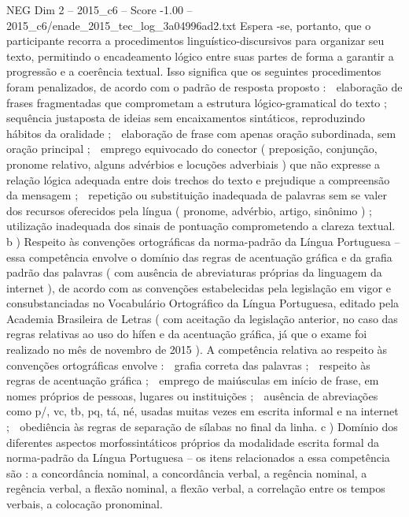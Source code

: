 \begin{textsample}{NEG Dim 2 – 2015\_c6 – Score -1.00 – 2015\_c6/enade\_2015\_tec\_log\_3a04996ad2.txt}
Espera -se, portanto, que o participante recorra a procedimentos linguístico-discursivos para organizar seu texto, permitindo o encadeamento lógico entre suas partes de forma a garantir a progressão e a coerência textual.
Isso significa que os seguintes procedimentos foram penalizados, de acordo com o padrão de resposta proposto :  elaboração de frases fragmentadas que comprometam a estrutura lógico-gramatical do texto ;  sequência justaposta de ideias sem encaixamentos sintáticos, reproduzindo hábitos da oralidade ;  elaboração de frase com apenas oração subordinada, sem oração principal ;  emprego equivocado do conector ( preposição, conjunção, pronome relativo, alguns advérbios e locuções adverbiais ) que não expresse a relação lógica adequada entre dois trechos do texto e prejudique a compreensão da mensagem ;  repetição ou substituição inadequada de palavras sem se valer dos recursos oferecidos pela língua ( pronome, advérbio, artigo, sinônimo ) ;  utilização inadequada dos sinais de pontuação comprometendo a clareza textual. b ) Respeito às convenções ortográficas da norma-padrão da Língua Portuguesa – essa competência envolve o domínio das regras de acentuação gráfica e da grafia padrão das palavras ( com ausência de abreviaturas próprias da linguagem da internet ), de acordo com as convenções estabelecidas pela legislação em vigor e consubstanciadas no Vocabulário Ortográfico da Língua Portuguesa, editado pela Academia Brasileira de Letras ( com aceitação da legislação anterior, no caso das regras relativas ao uso do hífen e da acentuação gráfica, já que o exame foi realizado no mês de novembro de 2015 ).
A competência relativa ao respeito às convenções ortográficas envolve :  grafia correta das palavras ;  respeito às regras de acentuação gráfica ;  emprego de maiúsculas em início de frase, em nomes próprios de pessoas, lugares ou instituições ;  ausência de abreviações como p/, vc, tb, pq, tá, né, usadas muitas vezes em escrita informal e na internet ;  obediência às regras de separação de sílabas no final da linha. c ) Domínio dos diferentes aspectos morfossintáticos próprios da modalidade escrita formal da norma-padrão da Língua Portuguesa – os itens relacionados a essa competência são : a concordância nominal, a concordância verbal, a regência nominal, a regência verbal, a flexão nominal, a flexão verbal, a correlação entre os tempos verbais, a colocação pronominal.

\end{textsample}

